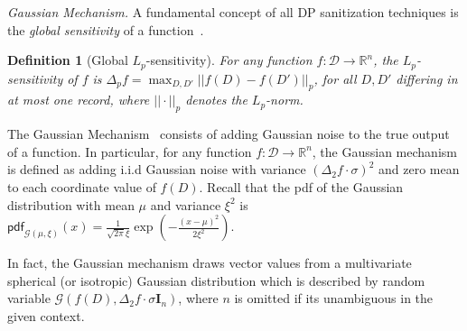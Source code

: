 \documentclass[accepted]{uai2021} %
\newcommand{\descr}[1]{\vspace{0.1cm}\noindent\textit{#1}}
\newtheorem{definition}{Definition}
\begin{document}
\descr{Gaussian Mechanism.} %
A fundamental concept of all DP sanitization techniques is the \emph{global sensitivity} of a function~\citep{Dwork2014book}.
\begin{definition}[Global $L_p$-sensitivity] 
For any function $f:\mathcal{D} \rightarrow \mathbb{R}^ n$, the $L_p$-sensitivity of $f$ is
$\Delta_p f = \max_{D, D'} || f(D)-f(D') ||_p$, 
for all $D, D'$ differing in at most one record, where $||\cdot||_p$ denotes the $L_p$-norm.\vspace*{-0.15cm}
\label{def:global_sens}
\end{definition}
\smallskip
The Gaussian Mechanism~\citep{Dwork2014book} 
consists of adding Gaussian noise to the true output of a function.
In particular, for any function $f:\mathcal{D} \rightarrow \mathbb{R}^n$, the Gaussian mechanism is defined as adding i.i.d Gaussian noise with variance $(\Delta_2 f \cdot \sigma)^2$  and zero mean to each coordinate value of  $f(D)$. Recall that the pdf of the Gaussian distribution with mean $\mu$ and variance $\xi^2$ is
$
\mathsf{pdf}_{\mathcal{G}(\mu, \xi)}(x) = \frac{1}{\sqrt{2\pi}\xi} \exp\left(-\frac{(x-\mu)^2}{2 \xi^2}\right) 
$.

In fact, the Gaussian mechanism draws vector values from a multivariate spherical (or isotropic) Gaussian distribution
which is described by random variable $\mathcal{G}(f(D), \Delta_2 f \cdot \sigma\mathbf{I}_n)$, where $n$ is omitted if its unambiguous in the given context.





\end{document}
